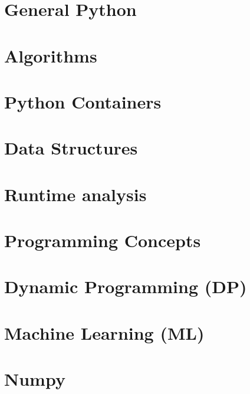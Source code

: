 \documentclass[numerate]{cheatsheet}
\author{Julian Lotzer – jlotzer@student.ethz.ch\\ 
Daniel Steinhauser – dsteinhauser@student.ethz.ch\\
Modified by:
Christian Leser - cleser@ethz.ch
\\ \vspace*{-0.2em}}
\begin{document}
\section{General Python} %
	
    
    
    
    

\section{Algorithms} %
    
    

\section{Python Containers} %
    
    
    

\section{Data Structures} %
    
    
    

\section{Runtime analysis} %
    

\section{Programming Concepts} %

\section{Dynamic Programming (DP)} %

\section{Machine Learning (ML)} %

\section{Numpy} %
    
    
    
    
\end{document}
